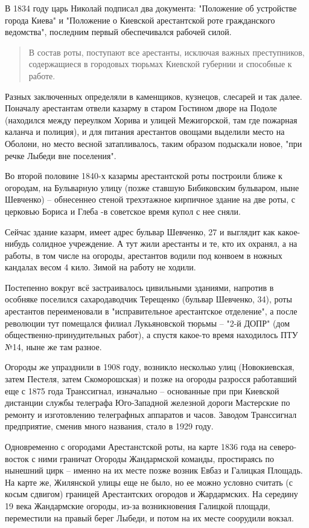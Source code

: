В 1834 году царь Николай подписал два документа: "Положение об устройстве города Киева" и "Положение о Киевской арестантской роте гражданского ведомства", последним первый обеспечивался рабочей силой.

\begin{quotation}
В состав роты, поступают все арестанты, исключая важных преступников, содержащиеся в городовых тюрьмах Киевской губернии и способные к работе.
\end{quotation}

Разных заключенных определяли в каменщиков, кузнецов, слесарей и так далее. Поначалу арестантам отвели казарму в старом Гостином дворе на Подоле (находился между переулком Хорива и улицей Межигорской, там где пожарная каланча и полиция), и для питания арестантов овощами выделили место на Оболони, но место весной затапливалось, таким образом подыскали новое, "при речке Лыбеди вне поселения".

Во второй половине 1840-х казармы арестантской роты построили ближе к огородам, на Бульварную улицу (позже ставшую Бибиковским бульваром, ныне Шевченко) – обнесеннео стеной трехэтажное кирпичное здание на две роты, с церковью Бориса и Глеба  -в советское время купол с нее сняли.  

Сейчас здание казарм, имеет адрес бульвар Шевченко, 27 и выглядит как какое-нибудь солидное учреждение. А тут жили арестанты и те, кто их охранял, а на работы, в том числе на огороды, арестантов водили под конвоем в ножных кандалах весом 4 кило. Зимой на работу не ходили.

Постепенно вокруг всё застраивалось цивильными зданиями, напротив в особняке поселился сахародаводчик Терещенко (бульвар Шевченко, 34), роты арестантов переименовали в "исправительное арестантское отделение", а после революции тут помещался филиал Лукьяновской тюрьмы – "2-й ДОПР" (дом общественно-принудительных работ), а спустя какое-то время находилось ПТУ №14, ныне же там разное.

Огороды же упразднили в 1908 году, возникло несколько улиц (Новокиевская, затем Пестеля, затем Скоморошская) и позже на огороды разросся работавший еще с 1875 года Транссигнал, изначально – основанные при при Киевской дистанции службы телеграфа Юго-Западной железной дороги Мастерские по ремонту и изготовлению телеграфных аппаратов и часов. Заводом Транссигнал предприятие, сменив много названия, стало в 1929 году.

Одновременно с огородами Арестанстской роты, на карте 1836 года на северо-восток с ними граничат Огороды Жандармской команды, простираясь по нынешний цирк – именно на их месте позже возник Евбаз и Галицкая Площадь. На карте же, Жилянской улицы еще не было, но ее можно условно считать (с косым сдвигом) границей Арестантских огородов и Жардармских. На середину 19 века Жандармские огороды, из-за возникновения Галицкой площади, переместили на правый берег Лыбеди, и потом на их месте соорудили вокзал.\\

